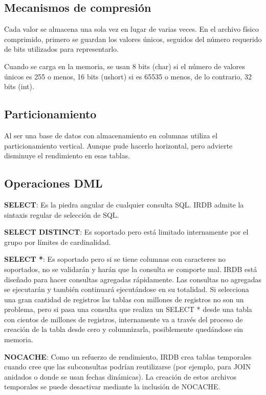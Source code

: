 \documentclass{acmart}
\begin{document}
\subsection{Mecanismos de compresión}

Cada valor se almacena una sola vez en lugar de varias veces. En el archivo físico comprimido, primero se guardan los valores únicos, seguidos del número requerido de bits utilizados para representarlo.

Cuando se carga en la memoria, se usan 8 bits (char) si el número de valores únicos es 255 o menos, 16 bits (ushort) si es 65535 o menos, de lo contrario, 32 bits (int).

\subsection{Particionamiento}

Al ser una base de datos con almacenamiento en columnas utiliza el particionamiento vertical. Aunque pude hacerlo horizontal, pero advierte disminuye el rendimiento en esas tablas.

\subsection{Operaciones DML}

\textbf{SELECT}: Es la piedra angular de cualquier consulta SQL. IRDB admite la sintaxis regular de selección de SQL.

\textbf{SELECT DISTINCT}: Es soportado pero está limitado internamente por el grupo por límites de cardinalidad.

\textbf{SELECT *}: Es soportado pero si se tiene columnas con caracteres no soportados, no se validarán y harán que la consulta se comporte mal. IRDB está diseñado para hacer consultas agregadas rápidamente. Las consultas no agregadas se ejecutarán y también continuará ejecutándose en su totalidad. Si selecciona una gran cantidad de registros las tablas con millones de registros no son un problema, pero si pasa una consulta que realiza un SELECT * desde una tabla con cientos de millones de registros, internamente va a través del proceso de creación de la tabla desde cero y columnizarla, posiblemente quedándose sin memoria.

\textbf{NOCACHE}: Como un refuerzo de rendimiento, IRDB crea tablas temporales cuando cree que las subconsultas podrían reutilizarse (por ejemplo, para JOIN anidados o donde se usan fechas dinámicas). La creación de estos archivos temporales se puede desactivar mediante la inclusión de NOCACHE.
\end{document}
